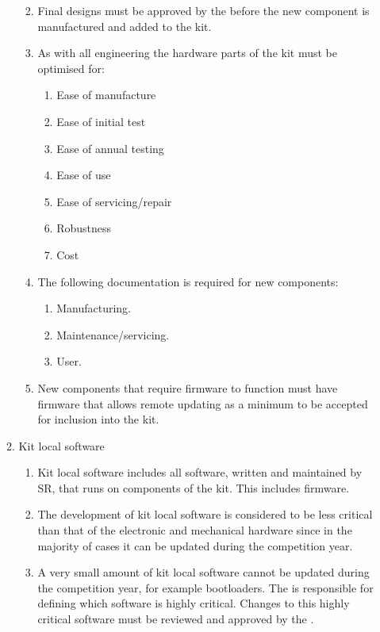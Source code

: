 \begin{enumerate}
\begin{enumerate}
\begin{enumerate}
\begin{enumerate}
          \end{enumerate}
        \item Final designs must be approved by the  before the new component is manufactured and added to the kit.
        \item As with all engineering the hardware parts of the kit must be optimised for:
          \begin{enumerate}
            \item Ease of manufacture
            \item Ease of initial test
            \item Ease of annual testing
            \item Ease of use
            \item Ease of servicing/repair
            \item Robustness
            \item Cost
          \end{enumerate}
        \item The following documentation is required for new components:
          \begin{enumerate}
            \item Manufacturing.
            \item Maintenance/servicing.
            \item User.
          \end{enumerate}
        \item New components that require firmware to function must have firmware that allows remote updating as a minimum to be accepted for inclusion into the kit.
      \end{enumerate}
    \item Kit local software
      \begin{enumerate}
        \item Kit local software includes all software, written and maintained by SR, that runs on components of the kit. This includes firmware.
        \item The development of kit local software is considered to be less critical than that of the electronic and mechanical hardware since in the majority of cases it can be updated during the competition year.
        \item A very small amount of kit local software cannot be updated during the competition year, for example bootloaders. The  is responsible for defining which software is highly critical. Changes to this highly critical software must be reviewed and approved by the .

\end{enumerate}
\end{enumerate}
\end{enumerate}
